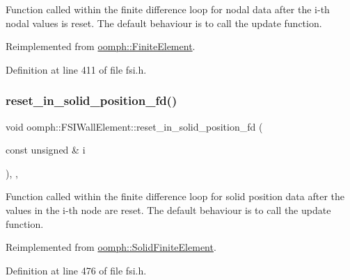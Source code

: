 Function called within the finite difference loop for nodal data after the i-\/th nodal values is reset. The default behaviour is to call the update function. 



Reimplemented from \hyperlink{classoomph_1_1FiniteElement_a6d2bd49de1b5a4d49fe6ca53d95b3f5c}{oomph\+::\+Finite\+Element}.



Definition at line 411 of file fsi.\+h.

\mbox{\label{classoomph_1_1FSIWallElement_aa7a250a0958768f5393484ea3c528a37}} 
\subsubsection{\texorpdfstring{reset\+\_\+in\+\_\+solid\+\_\+position\+\_\+fd()}{reset\_in\_solid\_position\_fd()}}
{\footnotesize\ttfamily void oomph\+::\+F\+S\+I\+Wall\+Element\+::reset\+\_\+in\+\_\+solid\+\_\+position\+\_\+fd (\begin{DoxyParamCaption}\item[{const unsigned \&}]{i }\end{DoxyParamCaption})\hspace{0.3cm}{\ttfamily [inline]}, {\ttfamily [protected]}, {\ttfamily [virtual]}}



Function called within the finite difference loop for solid position data after the values in the i-\/th node are reset. The default behaviour is to call the update function. 



Reimplemented from \hyperlink{classoomph_1_1SolidFiniteElement_a99e4613b1ac5f202c837c0e556f7b917}{oomph\+::\+Solid\+Finite\+Element}.



Definition at line 476 of file fsi.\+h.

\mbox{\label{classoomph_1_1FSIWallElement_a487a050241512f3979c4d67bb40b2a63}} 
